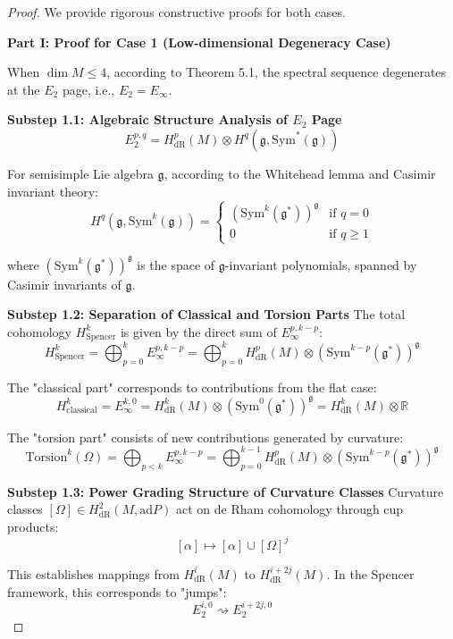 \documentclass[10pt,a4paper]{amsart}
\begin{document}
\begin{proof}
We provide rigorous constructive proofs for both cases.

\textbf{Part I: Proof for Case 1 (Low-dimensional Degeneracy Case)}

When $\dim M \leq 4$, according to Theorem 5.1, the spectral sequence degenerates at the $E_2$ page, i.e., $E_2 = E_\infty$.

\textbf{Substep 1.1: Algebraic Structure Analysis of $E_2$ Page}
$$E_2^{p,q} = H^p_{\text{dR}}(M) \otimes H^q(\mathfrak{g}, \text{Sym}^*(\mathfrak{g}))$$

For semisimple Lie algebra $\mathfrak{g}$, according to the Whitehead lemma and Casimir invariant theory:
$$H^q(\mathfrak{g}, \text{Sym}^k(\mathfrak{g})) = \begin{cases} 
(\text{Sym}^k(\mathfrak{g}^*))^\mathfrak{g} & \text{if } q = 0 \\
0 & \text{if } q \geq 1
\end{cases}$$

where $(\text{Sym}^k(\mathfrak{g}^*))^\mathfrak{g}$ is the space of $\mathfrak{g}$-invariant polynomials, spanned by Casimir invariants of $\mathfrak{g}$.

\textbf{Substep 1.2: Separation of Classical and Torsion Parts}
The total cohomology $H^k_{\text{Spencer}}$ is given by the direct sum of $E_\infty^{p,k-p}$:
$$H^k_{\text{Spencer}} = \bigoplus_{p=0}^k E_\infty^{p,k-p} = \bigoplus_{p=0}^k H^p_{\text{dR}}(M) \otimes (\text{Sym}^{k-p}(\mathfrak{g}^*))^\mathfrak{g}$$

The "classical part" corresponds to contributions from the flat case:
$$H^k_{\text{classical}} = E_\infty^{k,0} = H^k_{\text{dR}}(M) \otimes (\text{Sym}^0(\mathfrak{g}^*))^\mathfrak{g} = H^k_{\text{dR}}(M) \otimes \mathbb{R}$$

The "torsion part" consists of new contributions generated by curvature:
$$\text{Torsion}^k(\Omega) = \bigoplus_{p < k} E_\infty^{p,k-p} = \bigoplus_{p=0}^{k-1} H^p_{\text{dR}}(M) \otimes (\text{Sym}^{k-p}(\mathfrak{g}^*))^\mathfrak{g}$$

\textbf{Substep 1.3: Power Grading Structure of Curvature Classes}
Curvature classes $[\Omega] \in H^2_{\text{dR}}(M, \text{ad} P)$ act on de Rham cohomology through cup products:
$$[\alpha] \mapsto [\alpha] \cup [\Omega]^j$$

This establishes mappings from $H^i_{\text{dR}}(M)$ to $H^{i+2j}_{\text{dR}}(M)$. In the Spencer framework, this corresponds to "jumps":
$$E_2^{i,0} \rightsquigarrow E_2^{i+2j,0}$$


\end{proof}
\end{document}
